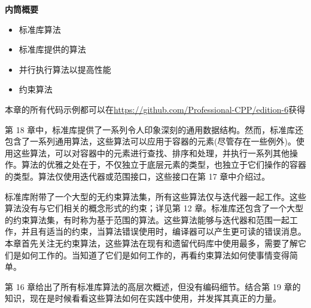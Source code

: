 \noindent
\textbf{内筒概要}

\begin{itemize}
\item
标准库算法

\item
标准库提供的算法

\item
并行执行算法以提高性能

\item
约束算法
\end{itemize}

本章的所有代码示例都可以在\url{https://github.com/Professional-CPP/edition-6}获得

第 18 章中，标准库提供了一系列令人印象深刻的通用数据结构。然而，标准库还包含了一系列通用算法，这些算法可以应用于容器的元素(尽管存在一些例外)。使用这些算法，可以对容器中的元素进行查找、排序和处理，并执行一系列其他操作。算法的优雅之处在于，不仅独立于底层元素的类型，也独立于它们操作的容器的类型。算法仅使用迭代器或范围接口，这些接口在第 17 章中介绍过。

标准库附带了一个大型的无约束算法集，所有这些算法仅与迭代器一起工作。这些算法没有与它们相关的概念形式的约束；详见第 12 章。标准库还包含了一个大型的约束算法集，有时称为基于范围的算法。这些算法能够与迭代器和范围一起工作，并且有适当的约束，当算法错误使用时，编译器可以产生更可读的错误消息。本章首先关注无约束算法，这些算法在现有和遗留代码库中使用最多，需要了解它们是如何工作的。当知道了它们是如何工作的，再看约束算法如何使事情变得简单。

第 16 章给出了所有标准库算法的高层次概述，但没有编码细节。结合第 19 章的知识，现在是时候看看这些算法如何在实践中使用，并发挥其真正的力量。
